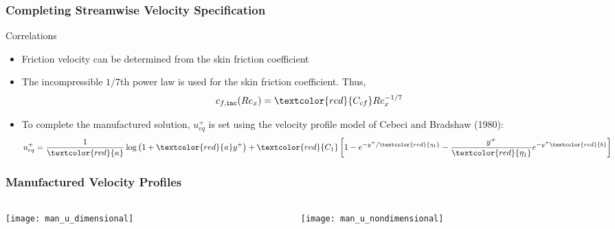 \documentclass[mathserif]{beamer}
\begin{document}
 \begin{frame}
   \frametitle{Completing Streamwise Velocity Specification}
  

  \begin{block}{Correlations}
   \begin{itemize}

    \item Friction velocity can be determined from the skin friction coefficient

   \item The incompressible $1/7$th power law is used
	 for the skin friction coefficient.  Thus,
	 \begin{equation*}\label{eq:u_05}
	  c_{f,\texttt{inc}}(Re_x) = \textcolor{red}{C_{cf}} Re_{x}^{-1/7}
	 \end{equation*}
	 
   \item To complete the manufactured solution, $u^+_{eq}$ is set
	 using the velocity profile model of Cebeci and
	 Bradshaw (1980):
	 \begin{equation*}\label{eq:u_06}
	  u_{eq}^+ = \frac{1}{\textcolor{red}{\kappa}} \log \left( 1 + \textcolor{red}{\kappa} y^+ \right) + \textcolor{red}{C_1} \left[ 1 - e^{-y^+/\textcolor{red}{\eta_1}} - \frac{y^+}{\textcolor{red}{\eta_1}} e^{-y^+ \textcolor{red}{b}} \right]
	 \end{equation*}
    \end{itemize}
  \end{block}
 \end{frame}


 \begin{frame}
   \frametitle{Manufactured Velocity Profiles}

  \begin{columns}[c]
    \begin{column}{5cm}
    \begin{center}
     \texttt{[image: man\_u\_dimensional]} \\
    \end{center}
    \end{column}

   \begin{column}{5cm}
    \begin{center}
     \texttt{[image: man\_u\_nondimensional]} \\
    \end{center}
   \end{column}
  \end{columns}
    
 \end{frame}
\end{document}
